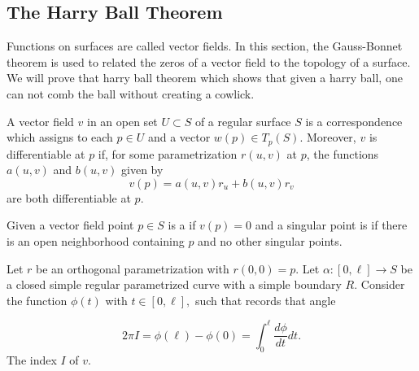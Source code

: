 \subsection{The Harry Ball Theorem}
\label{sec:harry-ball}

Functions on surfaces are called vector fields.
In this section, the Gauss-Bonnet theorem is used
to related the zeros of a vector field to the topology of a surface.
We will prove that harry ball theorem which shows that 
given a harry ball, one
can not comb the ball without creating a cowlick.

\cite{rotskoff2010}


\begin{definition}\label{def:vector-field}
	A vector field $v$  in an open set $U\subset S$ of a regular surface $S$
	is a correspondence which assigns to each $p\in U$ and a vector $w(p)\in T_p(S)$.
	Moreover, $v$ is differentiable at $p$ if, for some parametrization $r(u,v)$ at $p$,
	the functions $a(u,v)$ and $b(u,v)$ given by
		$$v(p)=a(u,v)r_u + b(u,v)r_v$$
	are both differentiable at $p$.
\end{definition}

Given a vector field point $p\in S$ is a  if $v(p)=0$
and a singular point is  if there is an open neighborhood
containing $p$ and no other singular points.



\begin{definition}[Index]\label{def:index}
Let $r$ be an orthogonal parametrization with $r(0,0)=p.$
Let $\alpha:[0,\ell]\to S$ be a closed simple regular parametrized curve with a 
simple boundary $R$.
Consider the function $\phi(t)$ with $t\in [0,\ell],$ such that records that angle 

$$2\pi I=\phi(\ell)-\phi(0)=\int_0^\ell \frac{d\phi}{dt}dt.$$
	The index $I$ of $v$.
\end{definition}

